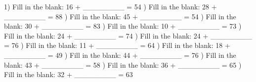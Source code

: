 \documentclass{article}%
\begin{document}
1) Fill in the blank: 16 + \_\_\_\_\_\_\_\_ = 54%
\newline%
\newline%
) Fill in the blank: 28 + \_\_\_\_\_\_\_\_ = 88%
\newline%
\newline%
) Fill in the blank: 45 + \_\_\_\_\_\_\_\_ = 54%
\newline%
\newline%
) Fill in the blank: 30 + \_\_\_\_\_\_\_\_ = 83%
\newline%
\newline%
) Fill in the blank: 10 + \_\_\_\_\_\_\_\_ = 73%
\newline%
\newline%
) Fill in the blank: 24 + \_\_\_\_\_\_\_\_ = 74%
\newline%
\newline%
) Fill in the blank: 24 + \_\_\_\_\_\_\_\_ = 76%
\newline%
\newline%
) Fill in the blank: 11 + \_\_\_\_\_\_\_\_ = 64%
\newline%
\newline%
) Fill in the blank: 18 + \_\_\_\_\_\_\_\_ = 49%
\newline%
\newline%
) Fill in the blank: 44 + \_\_\_\_\_\_\_\_ = 76%
\newline%
\newline%
) Fill in the blank: 43 + \_\_\_\_\_\_\_\_ = 58%
\newline%
\newline%
) Fill in the blank: 36 + \_\_\_\_\_\_\_\_ = 65%
\newline%
\newline%
) Fill in the blank: 32 + \_\_\_\_\_\_\_\_ = 63%
\newline%
\newline%
\newline%
\end{document}
